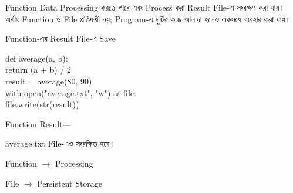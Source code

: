 

Function Data Processing করতে পারে এবং Process করা Result File-এ
সংরক্ষণ করা যায়। অর্থাৎ Function ও File প্রতিদ্বন্দ্বী নয়; Program-এ
দুটির কাজ আলাদা হলেও একসঙ্গে ব্যবহার করা যায়।

\begin{codeoutputbox}{Function-এর Result File-এ Save}
\noindent
\begin{minipage}[t]{0.58\linewidth}
\vspace{0pt}
\codeheading
\begin{english}
\ttfamily
def average(a, b):\\
\hspace*{4mm}return (a + b) / 2\\[0.5mm]
result = average(80, 90)\\[0.5mm]
with open("average.txt", "w") as file:\\
\hspace*{4mm}file.write(str(result))
\end{english}
\end{minipage}
\hfill
\begin{minipage}[t]{0.38\linewidth}
\vspace{0pt}
\outputheading

Function Result—

\begin{center}
\textenglish{}
\end{center}

\textenglish{\ttfamily average.txt} File-এও
\textenglish{} সংরক্ষিত হবে।

\medskip
Function \(\rightarrow\) Processing

File \(\rightarrow\) Persistent Storage
\end{minipage}
\end{codeoutputbox}



